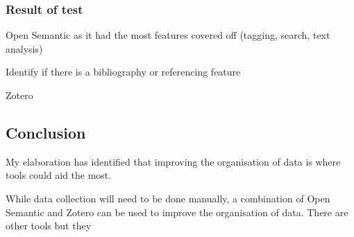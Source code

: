 \documentclass{article}
\begin{document}
\subsubsection*{Result of test}

Open Semantic as it had the most features covered off (tagging, search, text analysis)

Identify if there is a bibliography or referencing feature

Zotero


\subsection*{Conclusion}

My elaboration has identified that improving the organisation of data is where tools could aid the most.

While data collection will need to be done manually, a combination of Open Semantic and Zotero can be used to improve the organisation of data. There are other tools but they
\end{document}
